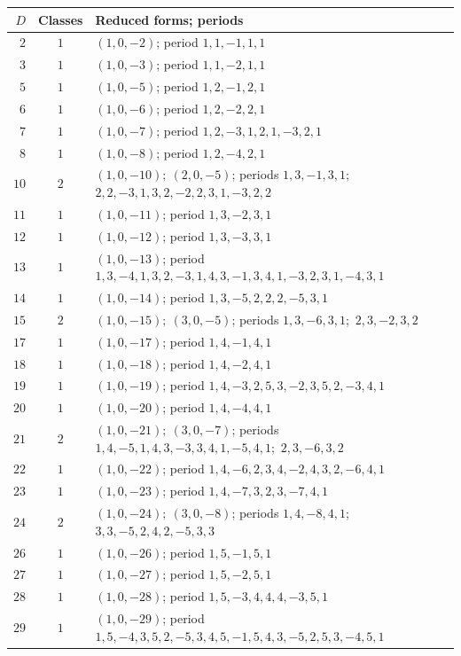 \documentclass[11pt,a4paper]{article}
\theoremstyle{plain}
\begin{document}
\medskip

\begin{longtable}{r|c|p{}}
$D$ & Classes & Reduced forms; periods \\
\hline
\endhead
$2$ & $1$ & $(1,0,-2)$; period $1,1,-1,1,1$ \\
$3$ & $1$ & $(1,0,-3)$; period $1,1,-2,1,1$ \\
$5$ & $1$ & $(1,0,-5)$; period $1,2,-1,2,1$ \\
$6$ & $1$ & $(1,0,-6)$; period $1,2,-2,2,1$ \\
$7$ & $1$ & $(1,0,-7)$; period $1,2,-3,1,2,1,-3,2,1$ \\
$8$ & $1$ & $(1,0,-8)$; period $1,2,-4,2,1$ \\
$10$ & $2$ & $(1,0,-10);\ (2,0,-5)$; periods $1,3,-1,3,1$;\ $2,2,-3,1,3,2,-2,2,3,1,-3,2,2$ \\
$11$ & $1$ & $(1,0,-11)$; period $1,3,-2,3,1$ \\
$12$ & $1$ & $(1,0,-12)$; period $1,3,-3,3,1$ \\
$13$ & $1$ & $(1,0,-13)$; period $1,3,-4,1,3,2,-3,1,4,3,-1,3,4,1,-3,2,3,1,-4,3,1$ \\
$14$ & $1$ & $(1,0,-14)$; period $1,3,-5,2,2,2,-5,3,1$ \\
$15$ & $2$ & $(1,0,-15);\ (3,0,-5)$; periods $1,3,-6,3,1$;\ $2,3,-2,3,2$ \\
$17$ & $1$ & $(1,0,-17)$; period $1,4,-1,4,1$ \\
$18$ & $1$ & $(1,0,-18)$; period $1,4,-2,4,1$ \\
$19$ & $1$ & $(1,0,-19)$; period $1,4,-3,2,5,3,-2,3,5,2,-3,4,1$ \\
$20$ & $1$ & $(1,0,-20)$; period $1,4,-4,4,1$ \\
$21$ & $2$ & $(1,0,-21);\ (3,0,-7)$; periods $1,4,-5,1,4,3,-3,3,4,1,-5,4,1$;\ $2,3,-6,3,2$ \\
$22$ & $1$ & $(1,0,-22)$; period $1,4,-6,2,3,4,-2,4,3,2,-6,4,1$ \\
$23$ & $1$ & $(1,0,-23)$; period $1,4,-7,3,2,3,-7,4,1$ \\
$24$ & $2$ & $(1,0,-24);\ (3,0,-8)$; periods $1,4,-8,4,1$;\ $3,3,-5,2,4,2,-5,3,3$ \\
$26$ & $1$ & $(1,0,-26)$; period $1,5,-1,5,1$ \\
$27$ & $1$ & $(1,0,-27)$; period $1,5,-2,5,1$ \\
$28$ & $1$ & $(1,0,-28)$; period $1,5,-3,4,4,4,-3,5,1$ \\
$29$ & $1$ & $(1,0,-29)$; period $1,5,-4,3,5,2,-5,3,4,5,-1,5,4,3,-5,2,5,3,-4,5,1$ \\

\end{longtable}
\end{document}
